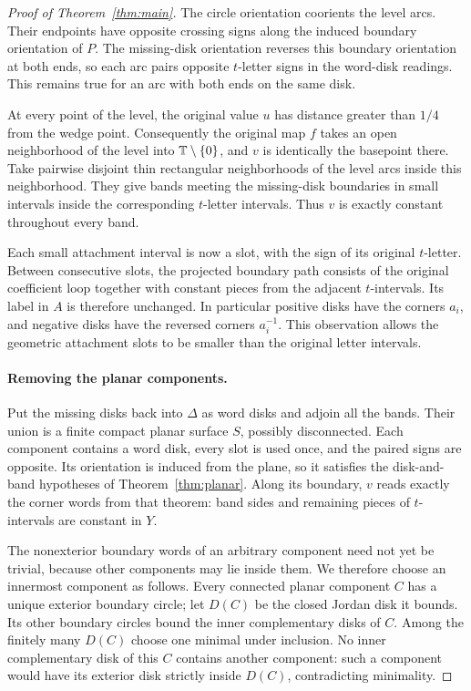 \begin{proof}[Proof of Theorem~\ref{thm:main}]
The circle orientation coorients the level arcs. Their endpoints have
opposite crossing signs along the induced boundary orientation of $P$.
The missing-disk orientation reverses this boundary orientation at both
ends, so each arc pairs opposite $t$-letter signs in the word-disk
readings. This remains true for an arc with both ends on the same disk.

At every point of the level, the original value $u$ has distance greater
than $1/4$ from the wedge point. Consequently the original map $f$ takes
an open neighborhood of the level into $\mathbb T\setminus\{0\}$, and $v$ is
identically the basepoint there. Take pairwise disjoint thin rectangular
neighborhoods of the level arcs inside this neighborhood. They give bands
meeting the missing-disk boundaries in small intervals inside the
corresponding $t$-letter intervals. Thus $v$ is exactly constant throughout
every band.

Each small attachment interval is now a slot, with the sign of its
original $t$-letter. Between consecutive slots, the projected boundary
path consists of the original coefficient loop together with constant
pieces from the adjacent $t$-intervals. Its label in $A$ is therefore
unchanged. In particular positive disks have the corners $a_i$, and
negative disks have the reversed corners $a_i^{-1}$. This observation
allows the geometric attachment slots to be smaller than the original
letter intervals.

\paragraph{Removing the planar components.}
Put the missing disks back into $\Delta$ as word disks and adjoin all
the bands. Their union is a finite compact planar surface $S$, possibly
disconnected. Each component contains a word disk, every slot is used
once, and the paired signs are opposite. Its orientation is induced from
the plane, so it satisfies the disk-and-band hypotheses of
Theorem~\ref{thm:planar}. Along its boundary, $v$ reads exactly the
corner words from that theorem: band sides and remaining pieces of
$t$-intervals are constant in $Y$.

The nonexterior boundary words of an arbitrary component need not yet be
trivial, because other components may lie inside them. We therefore choose
an innermost component as follows. Every connected planar component $C$
has a unique exterior boundary circle; let $D(C)$ be the closed Jordan
disk it bounds. Its other boundary circles bound the inner complementary
disks of $C$. Among the finitely many $D(C)$ choose one minimal under
inclusion. No inner complementary disk of this $C$ contains another
component: such a component would have its exterior disk strictly inside
$D(C)$, contradicting minimality.


\end{proof}
